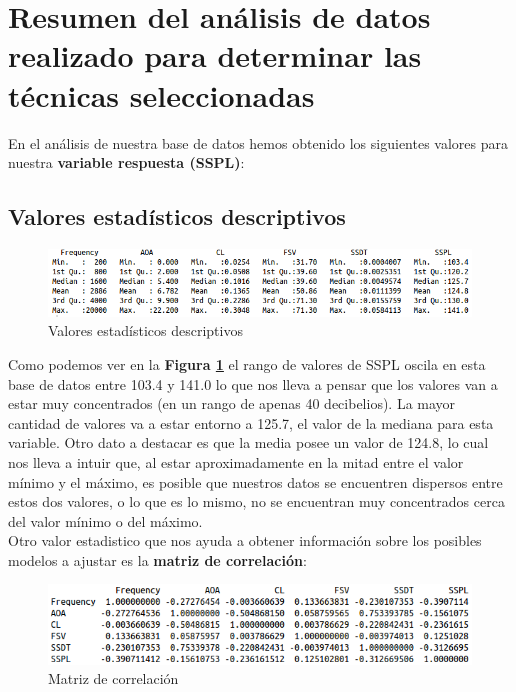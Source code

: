 \section{Resumen del análisis de datos realizado para determinar las técnicas seleccionadas}

En el análisis de nuestra base de datos hemos obtenido los siguientes valores para nuestra \textbf{variable respuesta (SSPL)}:

\subsection{Valores estadísticos descriptivos}
	
	\begin{figure}[H]
\centering
\includegraphics[scale=0.60]{Valores_estadisticos_descriptivos.png}
\caption{Valores estadísticos descriptivos}
\label{ved}
\end{figure}

Como podemos ver en la \textbf{Figura \ref{ved}} el rango de valores de SSPL oscila en esta base de datos entre 103.4 y 141.0 lo que nos lleva a pensar que los valores van a estar muy concentrados (en un rango de apenas 40 decibelios). La mayor cantidad de valores va a estar entorno a 125.7, el valor de la mediana para esta variable. Otro dato a destacar es que la media posee un valor de 124.8, lo cual nos lleva a intuir que, al estar aproximadamente en la mitad entre el valor mínimo y el máximo, es posible que nuestros datos se encuentren dispersos entre estos dos valores, o lo que es lo mismo, no se encuentran muy concentrados cerca del valor mínimo o del máximo.\\


Otro valor estadistico que nos ayuda a obtener información sobre los posibles modelos a ajustar es la \textbf{matriz de correlación}:

\begin{figure}[H]
\centering
\includegraphics[scale=0.65]{Matriz_de_correlacion.png}
\caption{Matriz de correlación}
\label{mc}
\end{figure}

